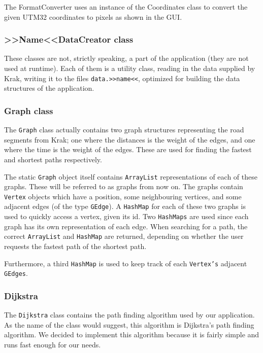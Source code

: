 The FormatConverter uses an instance of the Coordinates class to convert the given UTM32 coordinates to pixels as shown in the GUI.

\subsubsection{>>Name<<DataCreator class}
These classes are not, strictly speaking, a part of the application (they are not used at runtime). Each of them is a utility class, reading in the data supplied by Krak, writing it to the files \texttt{data.>>name<<}, optimized for building the data structures of the application.

\subsubsection{Graph class}
The \texttt{Graph} class actually contains two graph structures representing the road segments from Krak; one where the distances is the weight of the edges, and one where the time is the weight of the edges. These are used for finding the fastest and shortest paths respectively.
	
The static \texttt{Graph} object itself contains \texttt{ArrayList} representations of each of these graphs. These will be referred to as graphs from now on. The graphs contain \texttt{Vertex} objects which have a position, some neighbouring vertices, and some adjacent edges (of the type \texttt{GEdge}). A \texttt{HashMap} for each of these two graphs is used to quickly access a vertex, given its id. Two \texttt{HashMaps} are used since each graph has its own representation of each edge. When searching for a path, the correct \texttt{ArrayList} and \texttt{HashMap} are returned, depending on whether the user requests the fastest path of the shortest path.

Furthermore, a third \texttt{HashMap} is used to keep track of each \texttt{Vertex's} adjacent \texttt{GEdges}.

\subsubsection{Dijkstra}
The \texttt{Dijkstra} class contains the path finding algorithm used by our application. As the name of the class would suggest, this algorithm is Dijkstra's path finding algorithm. We decided to implement this algorithm because it is fairly simple and runs fast enough for our needs.
